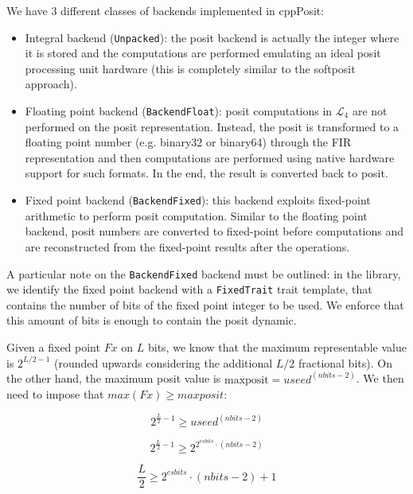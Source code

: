 We have 3 different classes of backends implemented in cppPosit:
\begin{itemize}
    \item Integral backend (\texttt{Unpacked}): the posit backend is actually the integer where it is stored and the computations are performed emulating an ideal posit processing unit hardware (this is completely similar to the softposit approach).
    \item Floating point backend (\texttt{BackendFloat}): posit computations in $\mathcal{L}_4$ are not performed on the posit representation. Instead, the posit is transformed to a floating point number (e.g. binary32 or binary64) through the FIR representation and then computations are performed using native hardware support for such formats. In the end, the result is converted back to posit. 
    \item Fixed point backend (\texttt{BackendFixed}): this backend exploits fixed-point arithmetic to perform posit computation. Similar to the floating point backend, posit numbers are converted to fixed-point before computations and are reconstructed from the fixed-point results after the operations.
\end{itemize}

A particular note on the \texttt{BackendFixed} backend must be outlined: in the library, we identify the fixed point backend with a \texttt{FixedTrait} trait template, that contains the number of bits of the fixed point integer to be used. We enforce that this amount of bits is enough to contain the posit dynamic. 

Given a fixed point $Fx$ on $L$ bits, we know that the maximum representable value is $2^{L/2 - 1}$ (rounded upwards considering the additional $L/2$ fractional bits). On the other hand, the maximum posit value is $\text{maxposit} = useed^{(nbits - 2)}$. We then need to impose that $max(Fx) \geq maxposit$: 

\begin{equation}
    2^{\frac{L}{2} - 1} \geq  useed^{(nbits - 2)}
\end{equation}

\begin{equation}
    2^{\frac{L}{2} - 1} \geq 2^{2^{esbits} \cdot (nbits - 2)}
\end{equation}

\begin{equation}
    \frac{L}{2} \geq 2^{esbits} \cdot (nbits - 2) + 1
\end{equation}

